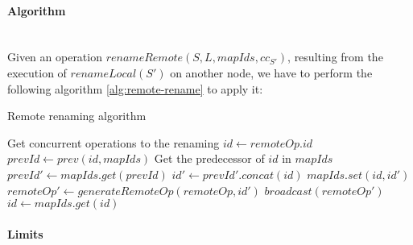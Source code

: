 \documentclass[a4paper]{article}
\begin{document}
\paragraph{Algorithm}~\\

Given an operation $renameRemote(S, L, mapIds, cc_{S'})$,
resulting from the execution of $renameLocal(S')$ on another node,
we have to perform the following algorithm \ref{alg:remote-rename} to apply it:

\begin{algorithm}
  \caption{Remote renaming algorithm}
  \label{alg:remote-rename}
  \begin{algorithmic}
      \Comment Get concurrent operations to the renaming
        \State $id \gets remoteOp.id$
          \State $prevId \gets prev(id, mapIds)$
          \Comment Get the predecessor of $id$ in $mapIds$
          \State $prevId' \gets mapIds.get(prevId)$
          \State $id' \gets prevId'.concat(id)$
          \State $mapIds.set(id, id')$
          \State $remoteOp' \gets generateRemoteOp(remoteOp, id')$
          \State $broadcast(remoteOp')$
        \EndIf
      \EndFor
        \State $id \gets mapIds.get(id)$
      \EndFor
    \EndProcedure
  \end{algorithmic}
\end{algorithm}

\paragraph{Limits}~\\
\end{document}
